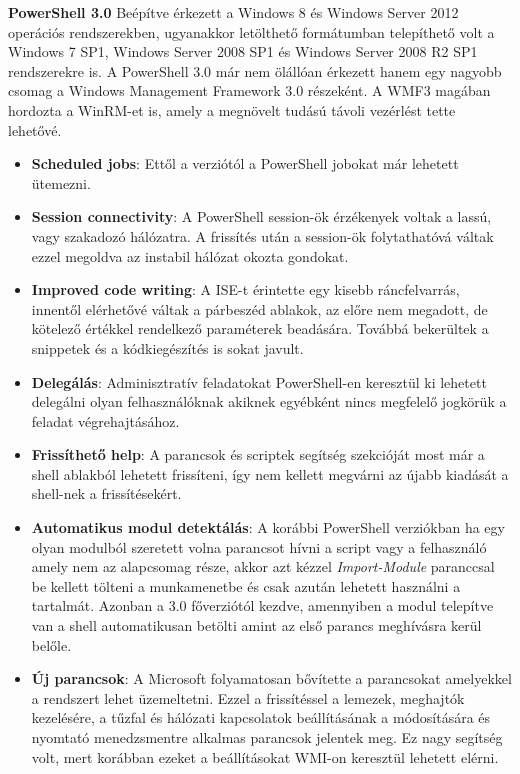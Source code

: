 \documentclass[12pt,oneside,justify,table]{book}
\begin{document}
\break
\noindent\textbf{PowerShell 3.0}
\newline Beépítve érkezett a Windows 8 és Windows Server 2012 operációs rendszerekben, ugyanakkor letölthető formátumban telepíthető volt a Windows 7 SP1, Windows Server 2008 SP1 és Windows Server 2008 R2 SP1 rendszerekre is. 
A PowerShell 3.0 már nem ölállóan érkezett hanem egy nagyobb csomag a Windows Management Framework 3.0 részeként. A WMF3 magában hordozta a WinRM-et is, amely a megnövelt tudású távoli vezérlést tette lehetővé.
\begin{itemize}
	\item \textbf{Scheduled jobs}: Ettől a verziótól a PowerShell jobokat már lehetett ütemezni.
	\item \textbf{Session connectivity}: A PowerShell session-ök érzékenyek voltak a lassú, vagy szakadozó hálózatra. A frissítés után a session-ök folytathatóvá váltak ezzel megoldva az instabil hálózat okozta gondokat.
	\item \textbf{Improved code writing}: A ISE-t érintette egy kisebb ráncfelvarrás, innentől elérhetővé váltak a párbeszéd ablakok, az előre nem megadott, de kötelező értékkel rendelkező paraméterek beadására. Továbbá bekerültek a snippetek és a kódkiegészítés is sokat javult.
	\item \textbf{Delegálás}: Adminisztratív feladatokat PowerShell-en keresztül ki lehetett delegálni olyan felhasználóknak akiknek egyébként nincs megfelelő jogkörük a feladat végrehajtásához. 
	\item \textbf{Frissíthető help}: A parancsok és scriptek segítség szekcióját most már a shell ablakból lehetett frissíteni, így nem kellett megvárni az újabb kiadását a shell-nek a frissítésekért.
	\item \textbf{Automatikus modul detektálás}: A korábbi PowerShell verziókban ha egy olyan modulból szeretett volna parancsot hívni a script vagy a felhasználó amely nem az alapcsomag része, akkor azt kézzel \textit{Import-Module} paranccsal be kellett tölteni a munkamenetbe és csak azután lehetett használni a tartalmát. Azonban a 3.0 főverziótól kezdve, amennyiben a modul telepítve van a shell automatikusan betölti amint az első parancs meghívásra kerül belőle.
	\item \textbf{Új parancsok}: A Microsoft folyamatosan bővítette a parancsokat amelyekkel a rendszert lehet üzemeltetni. Ezzel a frissítéssel a lemezek, meghajtók kezelésére, a tűzfal és hálózati kapcsolatok beállításának a módosítására és nyomtató menedzsmentre alkalmas parancsok jelentek meg. Ez nagy segítség volt, mert korábban ezeket a beállításokat WMI-on keresztül lehetett elérni. 
\end{itemize}
\end{document}
